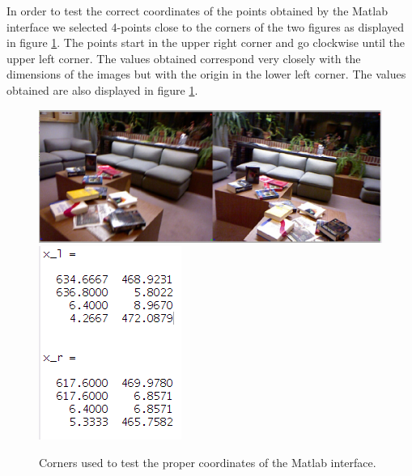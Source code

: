 \documentclass[a4paper,12pt]{article}
\begin{document}
In order to test the correct coordinates of the points obtained by the Matlab interface
we selected 4-points close to the corners of the two figures as displayed in figure \ref{fig:check}. 
The points start in the upper right corner and go clockwise until the upper left corner. 
The values obtained correspond very closely with the dimensions of the images but with the
origin in the lower left corner. The values obtained are also displayed in figure \ref{fig:check}.
\begin{figure}[h]
    \centering
    \includegraphics[totalheight=.20\textheight]{./images/Test.jpg}
    \vspace{1px}
    \includegraphics[totalheight=.18\textheight]{./images/TestPts.png}
    \caption{Corners used to test the proper coordinates of the Matlab interface.}
    \label{fig:check}
\end{figure}
\end{document}
